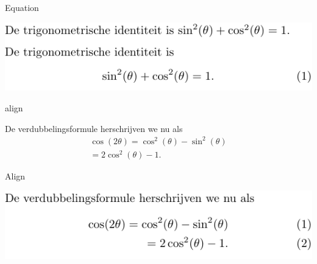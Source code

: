 \documentclass[../presentatie.tex]{subfiles}
\begin{document}

\begin{frame}{Equation}


	\includegraphics[width=\linewidth,height=0.4\textheight,keepaspectratio]{assets/5_Formules/mathEquation.pdf}

\end{frame}


\begin{saveblock}{align}
	\begin{highlightblock}[gobble=8,linewidth=\textwidth,
		framexleftmargin=0.25em,xleftmargin=0.25em]
		De verdubbelingsformule herschrijven we nu als
		\begin{align}
			\cos(2\theta) = \cos^2(\theta) - \sin^2(\theta)\\
			= 2\cos^2(\theta)-1.
		\end{align}
	\end{highlightblock}
\end{saveblock}


\begin{frame}{Align}

	\includegraphics[width=\linewidth,height=0.4\textheight,keepaspectratio]{assets/5_Formules/mathAlignUnaligned.pdf}
\end{frame}
\end{document}
